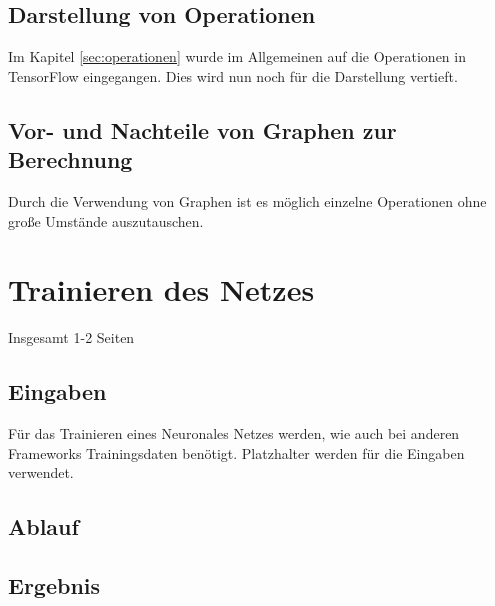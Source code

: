 \subsection{Darstellung von Operationen}
\label{sec:darstellungOperationen}
Im Kapitel \ref{sec:operationen} wurde im Allgemeinen auf die Operationen in TensorFlow eingegangen. Dies wird nun noch für die Darstellung vertieft. 

\subsection{Vor- und Nachteile von Graphen zur Berechnung}
\label{sec:vorUndNachteile}
Durch die Verwendung von Graphen ist es möglich einzelne Operationen ohne große Umstände auszutauschen.


\section{Trainieren des Netzes}
\label{sec:trainierenDesNetzes}
\printsubchapterauthor{\authorNiklas}
Insgesamt 1-2 Seiten


\subsection{Eingaben}
\label{sec:eingaben}
Für das Trainieren eines Neuronales Netzes werden, wie auch bei anderen Frameworks Trainingsdaten benötigt.
Platzhalter werden für die Eingaben verwendet.


\subsection{Ablauf}
\label{sec:ablauf}


\subsection{Ergebnis}
\label{sec:ergebnis}
